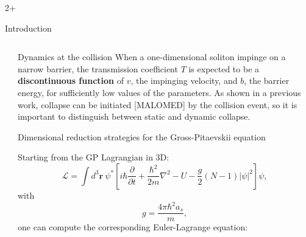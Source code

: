 \documentclass[final]{beamer}
\newlength{\sepwidth}
\newlength{\colwidth}
\newcommand{\separatorcolumn}{\begin{column}{\sepwidth}\end{column}}
\begin{document}
\begin{frame}[t]
\begin{columns}[t]
\begin{column}{2\colwidth+\sepwidth}
\begin{block}{Introduction}
  \end{block}
  \end{column}
  \end{columns}


  \begin{columns}[t]
    \separatorcolumn
    \begin{column}{\colwidth}
      
      \begin{block}{Dynamics at the collision}
        When a one-dimensional soliton impinge on a narrow barrier, the transmission coefficient $T$ is expected to be a \textbf{discontinuous function} of $v$, the impinging velocity, and $b$, the barrier energy, for sufficiently low values of the parameters. As shown in a previous work, collapse can be initiated [MALOMED] by the collision event, so it is important to distinguish between static and dynamic collapse.
        \begin{figure}
          \hspace{2cm}
      \end{figure}
      \end{block}

      \begin{exampleblock}{Dimensional reduction strategies for the Gross-Pitaevskii equation}{}
        
        Starting from the GP Lagrangian in 3D:
        \begin{equation}\label{eq:3dlagrangian}
        \mathcal{L}= \int d^3 \mathbf{r} \ \psi^* \left[i \hbar \frac{\partial}{\partial t}+\frac{\hbar^2}{2 m} \nabla^2-U-\frac{g}{2}(N-1)|\psi|^2 \right] \psi,
        \end{equation}
        with   
        \begin{equation}
          g = \frac{4\pi \hbar^2 a_s}{m},
        \end{equation}
        one can compute the corresponding Euler-Lagrange equation:


\end{exampleblock}
\end{column}
\end{columns}
\end{frame}
\end{document}
